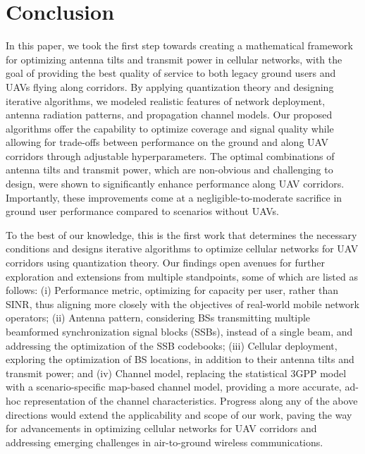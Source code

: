 \section{Conclusion}\label{conclusion}


In this paper, we took the first step towards creating a mathematical framework for optimizing antenna tilts and transmit power in cellular networks, with the goal of providing the best quality of service to both legacy ground users and UAVs flying along corridors. By applying quantization theory and designing iterative algorithms, we modeled realistic features of network deployment, antenna radiation patterns, and propagation channel models. Our proposed algorithms offer the capability to optimize coverage and signal quality %
while allowing for trade-offs between performance on the ground and along UAV corridors through adjustable hyperparameters. The optimal combinations of antenna tilts and transmit power, which are non-obvious and challenging to design, were shown to significantly enhance performance along UAV corridors. Importantly, these improvements come at a negligible-to-moderate sacrifice in ground user performance compared to scenarios without UAVs.

To the best of our knowledge, this is the first work that determines the necessary conditions and designs iterative algorithms to optimize cellular networks for UAV corridors using quantization theory. Our findings open avenues for further exploration and extensions from multiple standpoints, some of which are listed as follows: (i) Performance metric, optimizing for capacity per user, rather than SINR, thus aligning more closely with the objectives of real-world mobile network operators; 
(ii) Antenna pattern, considering BSs transmitting multiple beamformed synchronization signal blocks (SSBs), instead of a single beam, and addressing the optimization of the SSB codebooks;
(iii) Cellular deployment, exploring the optimization of BS locations, in addition to their antenna tilts and transmit power; and
(iv) Channel model, replacing the statistical 3GPP model with a scenario-specific map-based channel model, providing a more accurate, ad-hoc representation of the channel characteristics. 
Progress along any of the above directions would extend the applicability and scope of our work, paving the way for advancements in optimizing cellular networks for UAV corridors and addressing emerging challenges in air-to-ground wireless communications.